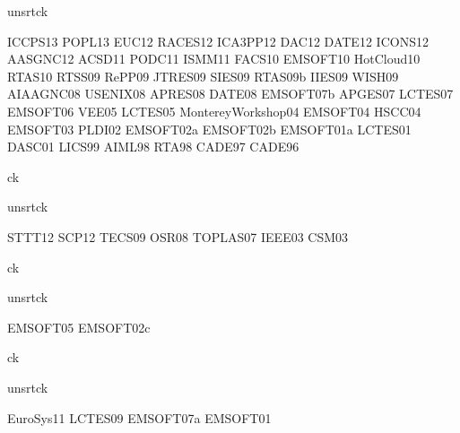 {unsrtck}

\nocite{conferences}{ICCPS13}
\nocite{conferences}{POPL13}
\nocite{conferences}{EUC12}
\nocite{conferences}{RACES12}
\nocite{conferences}{ICA3PP12}
\nocite{conferences}{DAC12}
\nocite{conferences}{DATE12}
\nocite{conferences}{ICONS12}
\nocite{conferences}{AASGNC12}
\nocite{conferences}{ACSD11}
\nocite{conferences}{PODC11}
\nocite{conferences}{ISMM11}
\nocite{conferences}{FACS10}
\nocite{conferences}{EMSOFT10}
\nocite{conferences}{HotCloud10}
\nocite{conferences}{RTAS10}
\nocite{conferences}{RTSS09}
\nocite{conferences}{RePP09}
\nocite{conferences}{JTRES09}
\nocite{conferences}{SIES09}
\nocite{conferences}{RTAS09b}
\nocite{conferences}{IIES09}
\nocite{conferences}{WISH09}
\nocite{conferences}{AIAAGNC08}
\nocite{conferences}{USENIX08}
\nocite{conferences}{APRES08}
\nocite{conferences}{DATE08}
\nocite{conferences}{EMSOFT07b}
\nocite{conferences}{APGES07}
\nocite{conferences}{LCTES07}
\nocite{conferences}{EMSOFT06}
\nocite{conferences}{VEE05}
\nocite{conferences}{LCTES05}
\nocite{conferences}{MontereyWorkshop04}
\nocite{conferences}{EMSOFT04}
\nocite{conferences}{HSCC04}
\nocite{conferences}{EMSOFT03}
\nocite{conferences}{PLDI02}
\nocite{conferences}{EMSOFT02a}
\nocite{conferences}{EMSOFT02b}
\nocite{conferences}{EMSOFT01a}
\nocite{conferences}{LCTES01}
\nocite{conferences}{DASC01}
\nocite{conferences}{LICS99}
\nocite{conferences}{AIML98}
\nocite{conferences}{RTA98}
\nocite{conferences}{CADE97}
\nocite{conferences}{CADE96}

{ck}{}


{unsrtck}

\nocite{journals}{STTT12}
\nocite{journals}{SCP12}
\nocite{journals}{TECS09}
\nocite{journals}{OSR08}
\nocite{journals}{TOPLAS07}
\nocite{journals}{IEEE03}
\nocite{journals}{CSM03}

{ck}{}


{unsrtck}

\nocite{invited}{EMSOFT05}
\nocite{invited}{EMSOFT02c}

{ck}{}


{unsrtck}

\nocite{books}{EuroSys11}
\nocite{books}{LCTES09}
\nocite{books}{EMSOFT07a}
\nocite{books}{EMSOFT01}

